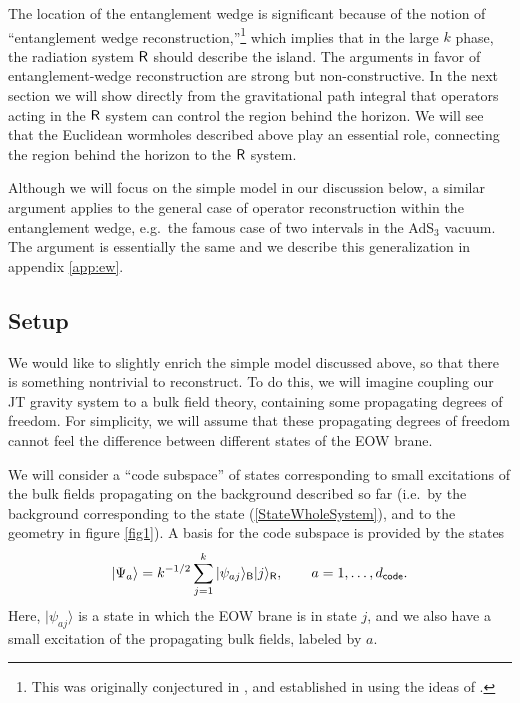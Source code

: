 \documentclass[12pt]{article}
\newcommand{\be}{\begin{equation}}
\newcommand{\ee}{\end{equation}}
\numberwithin{equation}{section}
\begin{document}
The location of the entanglement wedge is significant because of the notion of ``entanglement wedge reconstruction,''\footnote{This was originally conjectured in \cite{Headrick:2014cta,Czech:2012bh,Wall:2012uf}, and established in \cite{Jafferis:2015del,Dong:2016eik,Cotler:2017erl} using the ideas of \cite{Faulkner:2013ana}.} which implies that in the large $k$ phase, the radiation system $\sf{R}$ should describe the island. The arguments in favor of entanglement-wedge reconstruction \cite{Faulkner:2013ana,Jafferis:2015del,Dong:2016eik,Cotler:2017erl} are strong but non-constructive. In the next section we will show directly from the gravitational path integral that operators acting in the $\sf{R}$ system can control the region behind the horizon. We will see that the Euclidean wormholes described above play an essential role, connecting the region behind the horizon to the $\sf{R}$ system.

Although we will focus on the simple model in our discussion below, a similar argument applies to the general case of operator reconstruction within the entanglement wedge, e.g.~the famous case of two intervals in the AdS$_3$ vacuum. The argument is essentially the same and we describe this generalization in appendix \ref{app:ew}.

\subsection{Setup}
We would like to slightly enrich the simple model discussed above, so that there is something nontrivial to reconstruct. To do this, we will imagine coupling our JT gravity system to a bulk field theory, containing some propagating degrees of freedom. For simplicity, we will assume that these propagating degrees of freedom cannot feel the difference between different states of the EOW brane.

We will consider a ``code subspace'' of states corresponding to small excitations of the bulk fields propagating on the background described so far (i.e.~by the background corresponding to the state (\ref{StateWholeSystem}), and to the geometry in figure \ref{fig1}). A basis for the code subspace is provided by the states
\be
|\Psi_a\rangle = k^{-1/2}\sum_{j = 1}^k|\psi_{aj}\rangle_{\sf{B}}|j\rangle_{\sf{R}}, \hspace{20pt} a = 1,\dots,d_{\sf{code}}.
\ee
Here, $|\psi_{aj}\rangle$ is a state in which the EOW brane is in state $j$, and we also have a small excitation of the propagating bulk fields, labeled by $a$. 
\end{document}
